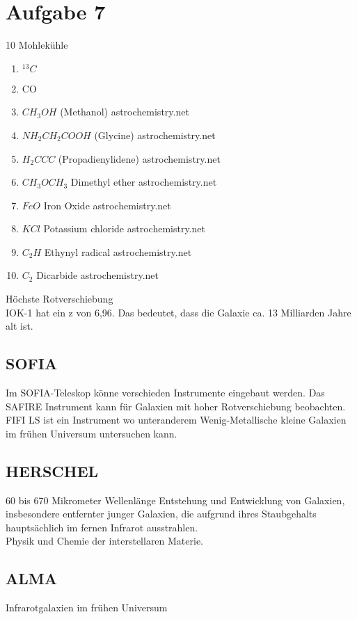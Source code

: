 \section{Aufgabe 7}
10 Mohlekühle
\begin{enumerate}
\item $^{13}C$
\item CO
\item $CH_{3}OH$ (Methanol) astrochemistry.net
\item $NH_2CH_2COOH$ (Glycine) astrochemistry.net
\item $H_2CCC$ (Propadienylidene) astrochemistry.net
\item $CH_3OCH_3$ Dimethyl ether astrochemistry.net
\item $FeO$	Iron Oxide astrochemistry.net
\item $KCl$	Potassium chloride astrochemistry.net
\item $C_2H$ Ethynyl radical astrochemistry.net
\item $C_2$ Dicarbide astrochemistry.net
\end{enumerate}
Höchste Rotverschiebung \\
IOK-1 \cite{iye2006galaxy} hat ein z von 6,96. Das bedeutet, dass die Galaxie ca. 13 Milliarden Jahre alt ist.
\subsection{SOFIA}
Im SOFIA-Teleskop könne verschieden Instrumente eingebaut werden. 
Das SAFIRE Instrument kann für Galaxien mit hoher Rotverschiebung beobachten.
FIFI LS ist ein Instrument wo unteranderem Wenig-Metallische kleine Galaxien im frühen Universum untersuchen kann.
\subsection{HERSCHEL}
60 bis 670 Mikrometer Wellenlänge
Entstehung und Entwicklung von Galaxien, insbesondere entfernter junger Galaxien, die aufgrund ihres Staubgehalts hauptsächlich im fernen Infrarot ausstrahlen. \\
Physik und Chemie der interstellaren Materie.
\subsection{ALMA}
Infrarotgalaxien im frühen Universum


